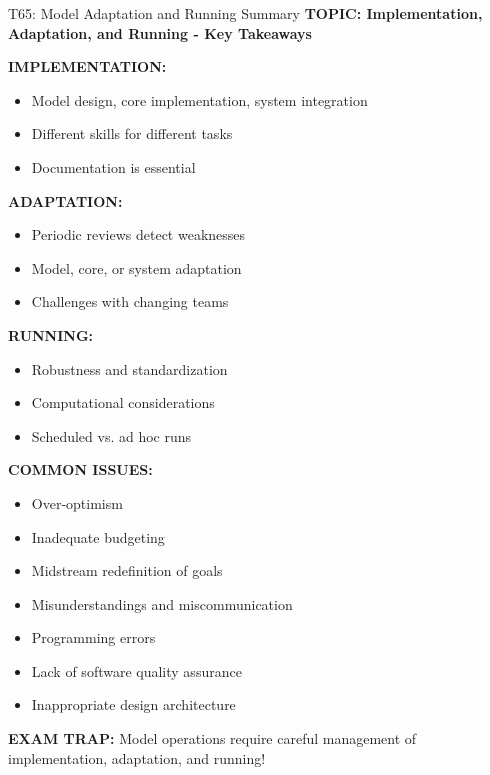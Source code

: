 \documentclass[8pt]{beamer}
\begin{document}
	\begin{frame}{T65: Model Adaptation and Running Summary}
		\fontsize{6.5}{7.5}\selectfont
		\textbf{TOPIC: Implementation, Adaptation, and Running - Key Takeaways}
		
		\vspace{0.1cm}
		\textbf{IMPLEMENTATION:}
		\begin{itemize}
			\item Model design, core implementation, system integration
			\item Different skills for different tasks
			\item Documentation is essential
		\end{itemize}
		
		\vspace{0.1cm}
		\textbf{ADAPTATION:}
		\begin{itemize}
			\item Periodic reviews detect weaknesses
			\item Model, core, or system adaptation
			\item Challenges with changing teams
		\end{itemize}
		
		\vspace{0.1cm}
		\textbf{RUNNING:}
		\begin{itemize}
			\item Robustness and standardization
			\item Computational considerations
			\item Scheduled vs. ad hoc runs
		\end{itemize}
		
		\vspace{0.1cm}
		\textbf{COMMON ISSUES:}
		\begin{itemize}
			\item Over-optimism
			\item Inadequate budgeting
			\item Midstream redefinition of goals
			\item Misunderstandings and miscommunication
			\item Programming errors
			\item Lack of software quality assurance
			\item Inappropriate design architecture
		\end{itemize}
		
		\textcolor{myred}{\textbf{EXAM TRAP:}} Model operations require \textcolor{myblue}{careful management of implementation, adaptation, and running}!
	\end{frame}
	
\end{document}
